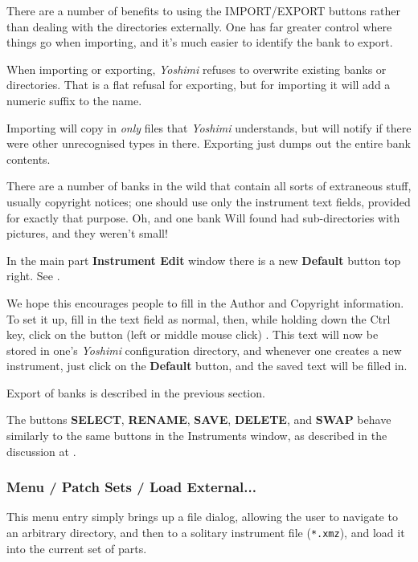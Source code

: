   There are a number of benefits to using the IMPORT/EXPORT buttons
   rather than dealing with the directories externally.
   One has far greater control where things go when
   importing, and it's much easier to identify the bank to export.

   When importing or exporting,
   \textsl{Yoshimi} refuses to overwrite existing banks or
   directories. That is a flat refusal for exporting, but for importing it will
   add a numeric suffix to the name.

   Importing will copy in \textsl{only} files that
   \textsl{Yoshimi} understands, but will notify
   if there were other unrecognised types in there.
   Exporting just dumps out the entire bank contents.

   There are a number of banks in the wild that contain all sorts of extraneous
   stuff, usually copyright notices; one should use only the instrument
   text fields, provided for exactly that purpose.
   Oh, and one bank Will found had sub-directories with pictures,
   and they weren't small!

   In the main part \textbf{Instrument Edit} window there is a new
   \textbf{Default} button top right.
   See .

   We hope this encourages people
   to fill in the Author and Copyright information.
   To set it up, fill in the text field as normal,
   then, while holding down the Ctrl key, click on the button
   (left or middle mouse click) . This text will now be stored in
   one's
   \textsl{Yoshimi} configuration directory,
   and whenever one creates a new instrument, just
   click on the \textbf{Default} button, and the saved text will be
   filled in.

   Export of banks is described in the previous section.

   The buttons \textbf{SELECT}, \textbf{RENAME}, \textbf{SAVE},
   \textbf{DELETE}, and \textbf{SWAP} behave similarly to the same buttons in
   the Instruments window, as
   described in the discussion at
   .

\subsubsection{Menu / Patch Sets / Load External...}
\label{subsubsec:menu_patch_sets_load}

   This menu entry simply brings up a file dialog, allowing the user to
   navigate to an arbitrary directory, and then to a solitary instrument file
   (\texttt{*.xmz}), and load it into the current set of parts.

